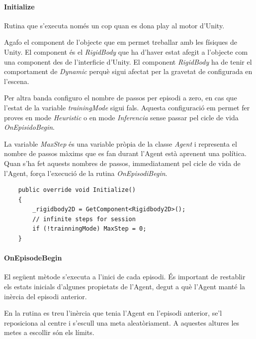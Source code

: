 \documentclass{article}
\begin{document}
    \paragraph{Initialize}
    
   Rutina que s'executa només un cop quan es dona play al motor d'Unity.

    Agafo el component de l'objecte que em permet treballar amb les físiques de Unity. El component és el \textit{RigidBody} que ha d'haver estat afegit a l'objecte com una component des de l'interficie d'Unity. El component \textit{RigidBody} ha de tenir el comportament de \textit{Dynamic} perquè sigui afectat per la gravetat de configurada en l'escena.
    
    Per altra banda configuro el nombre de passos per episodi a zero, en cas que l'estat de la variable \textit{trainingMode} sigui fals. Aquesta configuració em permet fer proves en mode \textit{Heuristic} o en mode \textit{Inferencia} sense passar pel cicle de vida \textit{OnEpisidoBegin}.
    
    La variable \textit{MaxStep} és una variable pròpia de la classe \textit{Agent} i representa el nombre de passos màxims que es fan durant l'Agent està aprenent una política. Quan s'ha fet aquests nombres de passos, immediatament pel cicle de vida de l'Agent, força l'execució de la rutina \textit{OnEpisodiBegin}. \\
    
    \begin{lstlisting}
    public override void Initialize()
    {
        _rigidbody2D = GetComponent<Rigidbody2D>();
        // infinite steps for session
        if (!trainningMode) MaxStep = 0;
    }
    \end{lstlisting}
    
    
    \newpage
    
    \paragraph{OnEpisodeBegin}
    
    El següent mètode s'executa a l'inici de cada episodi. És important de restablir els estats inicials d'algunes propietats de l'Agent, degut a què l'Agent manté la inèrcia del episodi anterior.

    En la rutina es treu l'inèrcia que tenia l'Agent en l'episodi anterior, se'l reposiciona al centre i s'escull una meta aleatòriament. A aquestes altures les metes a escollir són els límits.
    
\end{document}
